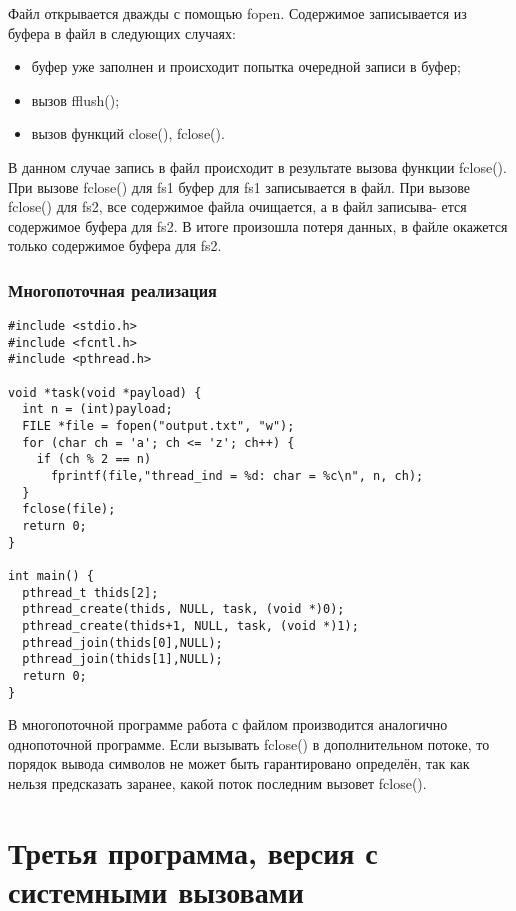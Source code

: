 Файл открывается дважды с помощью fopen. Содержимое записывается
из буфера в файл в следующих случаях:
\begin{itemize}
  \item буфер уже заполнен и происходит попытка очередной записи в буфер;
  \item вызов fflush();
  \item вызов функций close(), fclose().
\end{itemize}

В данном случае запись в файл происходит в результате вызова функции
fclose(). При вызове fclose() для fs1 буфер для fs1 записывается в файл. При
вызове fclose() для fs2, все содержимое файла очищается, а в файл записыва-
ется содержимое буфера для fs2. В итоге произошла потеря данных, в файле
окажется только содержимое буфера для fs2.

\subsubsection{Многопоточная реализация}
\begin{lstlisting}
#include <stdio.h>
#include <fcntl.h>
#include <pthread.h>

void *task(void *payload) {
  int n = (int)payload;
  FILE *file = fopen("output.txt", "w");
  for (char ch = 'a'; ch <= 'z'; ch++) {
    if (ch % 2 == n)
      fprintf(file,"thread_ind = %d: char = %c\n", n, ch);
  }
  fclose(file);
  return 0;
}

int main() {
  pthread_t thids[2];
  pthread_create(thids, NULL, task, (void *)0);
  pthread_create(thids+1, NULL, task, (void *)1);
  pthread_join(thids[0],NULL);
  pthread_join(thids[1],NULL);
  return 0;
}
\end{lstlisting}

В многопоточной программе работа с файлом производится аналогично
однопоточной программе. Если вызывать fclose() в дополнительном потоке, то
порядок вывода символов не может быть гарантировано определён, так как нельзя предсказать заранее, какой поток последним вызовет fclose().

\section{Третья программа, версия с системными вызовами}


